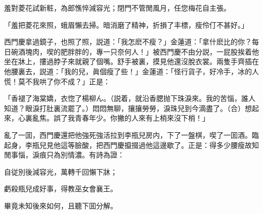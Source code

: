 羞對菱花試新粧，為郎憔悴減容光；閉門不管閒風月，任您梅花自主張。

「羞把菱花來照，蛾眉懶去掃。暗消磨了精神，折損了丰標，瘦伶仃不甚好。」

西門慶拿過鏡子，也照了照，説道：「我怎麽不瘦？」金蓮道：「拿什麽比的你？每日碗酒塊肉，喫的肥胖胖的，專一只奈何人！」被西門慶不由分説，一屁股挨着他坐在牀上，摟過脖子來就親了個嘴。舒手被裏，摸見他還沒脫衣裳。兩隻手齊插在他腰裏去，説道：「我的兒，眞個瘦了些！」金蓮道：「怪行貨子，好冷手，冰的人慌！莫不我哄了你不成？」正是：

「香褪了海棠嬌，衣惚了楊柳ん。（説着，就沿香腮抛下珠淚來。我的苦惱，誰人知道？眼淚打肚裏流罷了。）悶悶無聊，攘攘勞勞，淚珠兒到今滴盡了。（合）想起來，心裏亂焦。誤了我青春年少。你撇的人來有上梢來沒下梢！」

亂了一囬，西門慶還把他強死強活拉到李瓶兒房内，下了一盤棋，喫了一囬酒。臨起身，李瓶兒見他這等臉酸，把西門慶攛掇過他這邊歇了。正是：得多少腰瘦故知閒事惱，淚痕只為別情濃。有詩為證：

自従別後減容光，萬轉千回懶下牀；

虧殺瓶兒成好事，得教巫女會襄王。

畢竟未知後來如何，且聽下囬分解。

